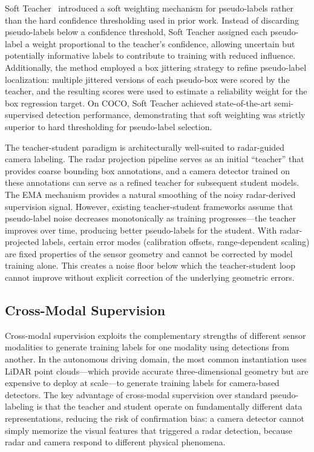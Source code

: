 Soft Teacher~\cite{xu2021soft} introduced a soft weighting mechanism for pseudo-labels rather than the hard confidence thresholding used in prior work. Instead of discarding pseudo-labels below a confidence threshold, Soft Teacher assigned each pseudo-label a weight proportional to the teacher's confidence, allowing uncertain but potentially informative labels to contribute to training with reduced influence. Additionally, the method employed a box jittering strategy to refine pseudo-label localization: multiple jittered versions of each pseudo-box were scored by the teacher, and the resulting scores were used to estimate a reliability weight for the box regression target. On COCO, Soft Teacher achieved state-of-the-art semi-supervised detection performance, demonstrating that soft weighting was strictly superior to hard thresholding for pseudo-label selection.

The teacher-student paradigm is architecturally well-suited to radar-guided camera labeling. The radar projection pipeline serves as an initial ``teacher'' that provides coarse bounding box annotations, and a camera detector trained on these annotations can serve as a refined teacher for subsequent student models. The EMA mechanism provides a natural smoothing of the noisy radar-derived supervision signal. However, existing teacher-student frameworks assume that pseudo-label noise decreases monotonically as training progresses---the teacher improves over time, producing better pseudo-labels for the student. With radar-projected labels, certain error modes (calibration offsets, range-dependent scaling) are fixed properties of the sensor geometry and cannot be corrected by model training alone. This creates a noise floor below which the teacher-student loop cannot improve without explicit correction of the underlying geometric errors.

\subsection{Cross-Modal Supervision}\label{subsec:cross_modal}

Cross-modal supervision exploits the complementary strengths of different sensor modalities to generate training labels for one modality using detections from another. In the autonomous driving domain, the most common instantiation uses LiDAR point clouds---which provide accurate three-dimensional geometry but are expensive to deploy at scale---to generate training labels for camera-based detectors. The key advantage of cross-modal supervision over standard pseudo-labeling is that the teacher and student operate on fundamentally different data representations, reducing the risk of confirmation bias: a camera detector cannot simply memorize the visual features that triggered a radar detection, because radar and camera respond to different physical phenomena.

